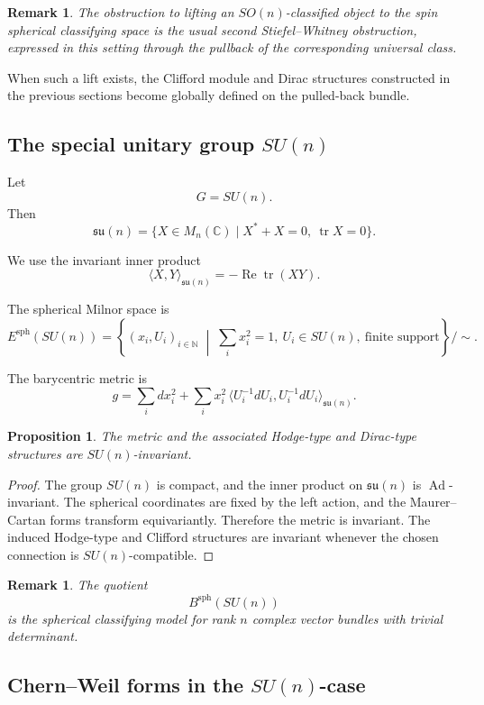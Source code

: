 \documentclass[11pt]{amsart}
\newtheorem{proposition}[theorem]{Proposition}
\newtheorem{remark}[theorem]{Remark}
\begin{document}
\begin{remark}
The obstruction to lifting an \(SO(n)\)-classified object to the spin spherical classifying space is the usual second Stiefel--Whitney obstruction, expressed in this setting through the pullback of the corresponding universal class.
\end{remark}

When such a lift exists, the Clifford module and Dirac structures constructed in the previous sections become globally defined on the pulled-back bundle.

\subsection{The special unitary group \(SU(n)\)}

Let
\[
G=SU(n).
\]
Then
\[
\mathfrak{su}(n)
=
\{X\in M_n(\mathbb C)\mid X^*+X=0,\ \operatorname{tr}X=0\}.
\]

We use the invariant inner product
\[
\langle X,Y\rangle_{\mathfrak{su}(n)}
=
-\operatorname{Re}\operatorname{tr}(XY).
\]

The spherical Milnor space is
\[
E^{\mathrm{sph}}(SU(n))
=
\left\{
(x_i,U_i)_{i\in\mathbb N}
\;\middle|\;
\sum_i x_i^2=1,\ U_i\in SU(n),\ \text{finite support}
\right\}/\sim.
\]

The barycentric metric is
\[
g
=
\sum_i dx_i^2
+
\sum_i x_i^2\,\langle U_i^{-1}dU_i,U_i^{-1}dU_i\rangle_{\mathfrak{su}(n)}.
\]

\begin{proposition}
The metric and the associated Hodge-type and Dirac-type structures are \(SU(n)\)-invariant.
\end{proposition}

\begin{proof}
The group \(SU(n)\) is compact, and the inner product on \(\mathfrak{su}(n)\) is \(\operatorname{Ad}\)-invariant. The spherical coordinates are fixed by the left action, and the Maurer--Cartan forms transform equivariantly. Therefore the metric is invariant. The induced Hodge-type and Clifford structures are invariant whenever the chosen connection is \(SU(n)\)-compatible.
\end{proof}

\begin{remark}
The quotient
\[
B^{\mathrm{sph}}(SU(n))
\]
is the spherical classifying model for rank \(n\) complex vector bundles with trivial determinant.
\end{remark}

\subsection{Chern--Weil forms in the \(SU(n)\)-case}
\end{document}
